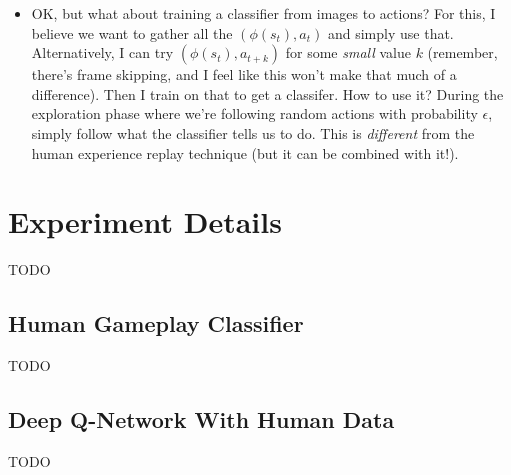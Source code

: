 \documentclass[letterpaper, 10pt, conference]{ieeeconf}
\begin{document}
\begin{itemize}
        \item OK, but what about training a classifier from images to actions?
        For this, I believe we want to gather all the $(\phi(s_t),a_t)$ and
        simply use that. Alternatively, I can try $(\phi(s_t),a_{t+k})$ for some
        \emph{small} value $k$ (remember, there's frame skipping, and I feel
        like this won't make that much of a difference). Then I train on that to
        get a classifer. How to use it? During the exploration phase where we're
        following random actions with probability $\epsilon$, simply follow what
        the classifier tells us to do. This is \emph{different} from the human
        experience replay technique (but it can be combined with it!).
\end{itemize}

\section{Experiment Details}\label{app:experiment_details}

TODO

\subsection{Human Gameplay Classifier}\label{app:experiment_details_human}

TODO

\subsection{Deep Q-Network With Human Data}\label{app:experiment_details_dqn}

TODO
\end{document}
